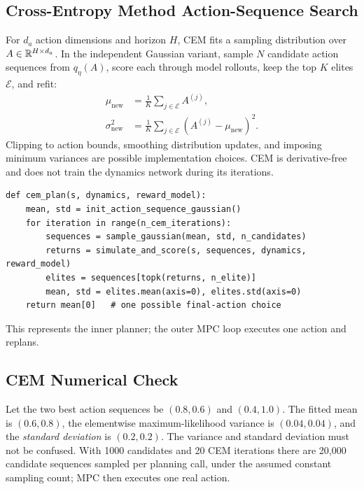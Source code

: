 \subsection{Cross-Entropy Method Action-Sequence Search}
For $d_a$ action dimensions and horizon $H$, CEM fits a sampling distribution over $A\in\mathbb{R}^{H\times d_a}$. In the independent Gaussian variant, sample $N$ candidate action sequences from $q_\eta(A)$, score each through model rollouts, keep the top $K$ elites $\mathcal E$, and refit:
\begin{align}
\mu_{\mathrm{new}}&=\frac1K\sum_{j\in\mathcal E}A^{(j)},\\
\sigma_{\mathrm{new}}^2&=\frac1K\sum_{j\in\mathcal E}
(A^{(j)}-\mu_{\mathrm{new}})^2.
\end{align}
Clipping to action bounds, smoothing distribution updates, and imposing minimum variances are possible implementation choices. CEM is derivative-free and does not train the dynamics network during its iterations.
\begin{verbatim}
def cem_plan(s, dynamics, reward_model):
    mean, std = init_action_sequence_gaussian()
    for iteration in range(n_cem_iterations):
        sequences = sample_gaussian(mean, std, n_candidates)
        returns = simulate_and_score(s, sequences, dynamics, reward_model)
        elites = sequences[topk(returns, n_elite)]
        mean, std = elites.mean(axis=0), elites.std(axis=0)
    return mean[0]   # one possible final-action choice
\end{verbatim}
This represents the inner planner; the outer MPC loop executes one action and replans.

\subsection{CEM Numerical Check}
Let the two best action sequences be $(0.8,0.6)$ and $(0.4,1.0)$. The fitted mean is $(0.6,0.8)$, the elementwise maximum-likelihood variance is $(0.04,0.04)$, and the \emph{standard deviation} is $(0.2,0.2)$. The variance and standard deviation must not be confused. With 1000 candidates and 20 CEM iterations there are 20,000 candidate sequences sampled per planning call, under the assumed constant sampling count; MPC then executes one real action.

